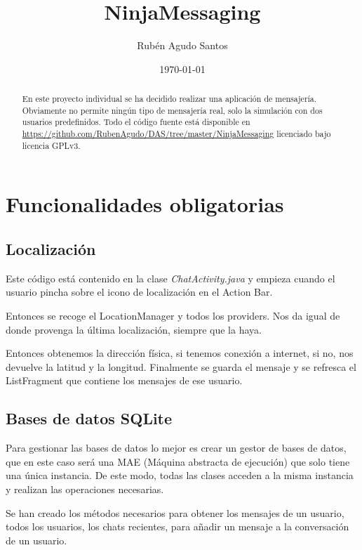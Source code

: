 \documentclass{article}
\begin{document}
\author{Rub\'{e}n Agudo Santos}
\title{NinjaMessaging}
\date{\today}
\maketitle

\begin{abstract}
En este proyecto individual se ha decidido realizar una aplicaci\'{o}n de 
mensajer\'{i}a. Obviamente no permite ning\'{u}n tipo de mensajer\'{i}a real,
solo la simulaci\'{o}n con dos usuarios predefinidos. Todo el c\'odigo fuente
est\'a disponible en \url{https://github.com/RubenAgudo/DAS/tree/master/NinjaMessaging} 
licenciado bajo licencia GPLv3.
\end{abstract}

\tableofcontents

\section{Funcionalidades obligatorias}

\subsection{Localizaci\'{o}n}
Este c\'{o}digo est\'{a} contenido en la clase \emph{ChatActivity.java} y empieza cuando el
usuario pincha sobre el icono de localizaci\'{o}n en el Action Bar. 

Entonces se recoge el LocationManager y todos los providers. Nos da igual de donde
provenga la \'{u}ltima localizaci\'{o}n, siempre que la haya.

Entonces obtenemos la direcci\'{o}n f\'{i}sica, si tenemos conexi\'{o}n a internet,
si no, nos devuelve la latitud y la longitud. Finalmente se guarda el mensaje y se
refresca el ListFragment que contiene los mensajes de ese usuario.

\subsection{Bases de datos SQLite}
Para gestionar las bases de datos lo mejor es crear un gestor de bases de datos, 
que en este caso ser\'{a} una MAE (M\'{a}quina abstracta de ejecuci\'{o}n) que solo
tiene una \'{u}nica instancia. De este modo, todas las clases acceden a la misma instancia
y realizan las operaciones necesarias.

Se han creado los m\'{e}todos necesarios para obtener los mensajes de un usuario, todos
los usuarios, los chats recientes, para a\~{n}adir un mensaje a la conversaci\'{o}n de un
usuario.
\end{document}

